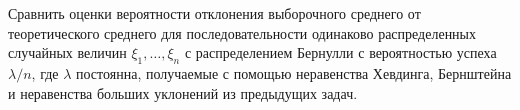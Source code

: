 \begin{problem}
Сравнить оценки вероятности отклонения выборочного среднего от теоретического среднего для последовательности одинаково распределенных случайных величин $\xi_1,\dots,\xi_n$ с распределением Бернулли с вероятностью успеха $\lambda/n$, где $\lambda$ постоянна, получаемые с помощью неравенства Хевдинга, Бернштейна и неравенства больших уклонений из предыдущих задач.
\end{problem}
\medskip 


